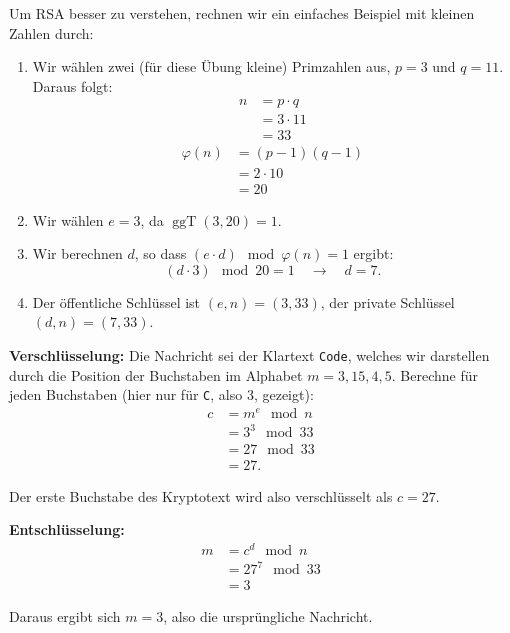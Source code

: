 \begin{myexample}
Um \gls{RSA} besser zu verstehen, rechnen wir ein einfaches Beispiel mit kleinen Zahlen durch:
\begin{enumerate}
	\item Wir wählen zwei (für diese Übung kleine) Primzahlen aus, \( p = 3 \) und \( q = 11 \). Daraus folgt:
	      \begin{align*}
		      n & = p \cdot q  \\
		        & = 3 \cdot 11 \\
		        & = 33
	      \end{align*}
	      \begin{align*}
		      \varphi(n) & = (p-1)(q-1) \\
		                 & = 2 \cdot 10 \\
		                 & = 20
	      \end{align*}
	\item Wir wählen \( e = 3 \), da \( \operatorname{ggT}(3, 20) = 1 \).
	\item Wir berechnen \( d \), so dass \( (e \cdot d) \mod \varphi(n) = 1  \) ergibt:
	      \[
		      (d \cdot 3) \mod 20 = 1  \quad \rightarrow \quad d = 7.
	      \]
	\item Der öffentliche Schlüssel ist \( (e, n) = (3, 33) \), der private Schlüssel \( (d, n) = (7, 33) \).
\end{enumerate}

\textbf{Verschlüsselung:} Die Nachricht sei der Klartext \texttt{Code}, welches wir darstellen durch die Position der Buchstaben im Alphabet \( m = 3, 15, 4, 5 \). Berechne für jeden Buchstaben (hier nur für \texttt{C}, also 3, gezeigt):
\begin{align*}
	c & = m^e \mod n  \\
	  & = 3^3 \mod 33 \\
	  & = 27 \mod 33  \\
	  & = 27.
\end{align*}


Der erste Buchstabe des Kryptotext wird also verschlüsselt als \( c = 27\).

\textbf{Entschlüsselung:}
\begin{align*}
	m & = c^d \mod n     \\
	  & = 27^{7} \mod 33 \\
	  & = 3
\end{align*}

Daraus ergibt sich \( m = 3 \), also die ursprüngliche Nachricht.
\end{myexample}



